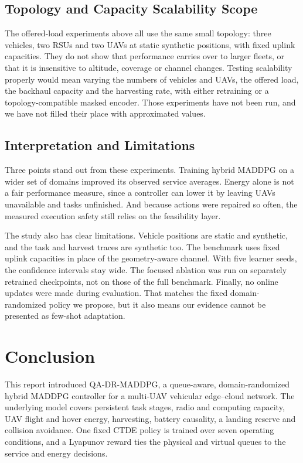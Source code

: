 \documentclass[journal]{IEEEtran}
\newcommand{\method}{QA-DR-MADDPG}
\begin{document}
\subsection{Topology and Capacity Scalability Scope}
The offered-load experiments above all use the same small topology: three
vehicles, two RSUs and two UAVs at static synthetic positions, with fixed
uplink capacities. They do not show that performance carries over to larger
fleets, or that it is insensitive to altitude, coverage or channel changes.
Testing scalability properly would mean varying the numbers of vehicles and
UAVs, the offered load, the backhaul capacity and the harvesting rate, with
either retraining or a topology-compatible masked encoder. Those experiments
have not been run, and we have not filled their place with approximated
values.

\subsection{Interpretation and Limitations}
Three points stand out from these experiments. Training hybrid MADDPG on a
wider set of domains improved its observed service averages. Energy alone is
not a fair performance measure, since a controller can lower it by leaving
UAVs unavailable and tasks unfinished. And because actions were repaired so
often, the measured execution safety still relies on the feasibility layer.

The study also has clear limitations. Vehicle positions are static and
synthetic, and the task and harvest traces are synthetic too. The benchmark
uses fixed uplink capacities in place of the geometry-aware channel. With
five learner seeds, the confidence intervals stay wide. The focused ablation
was run on separately retrained checkpoints, not on those of the full
benchmark. Finally, no online updates were made during evaluation. That
matches the fixed domain-randomized policy we propose, but it also means our
evidence cannot be presented as few-shot adaptation.

\section{Conclusion}
This report introduced \method, a queue-aware, domain-randomized hybrid
MADDPG controller for a multi-UAV vehicular edge--cloud network. The
underlying model covers persistent task stages, radio and computing capacity,
UAV flight and hover energy, harvesting, battery causality, a landing reserve
and collision avoidance. One fixed CTDE policy is trained over seven
operating conditions, and a Lyapunov reward ties the physical and virtual
queues to the service and energy decisions.
\end{document}

